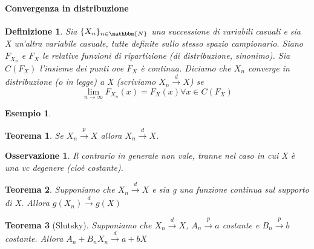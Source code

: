 \documentclass[11pt]{article}
\newtheorem{oss}{Osservazione}
\newtheorem{definizione}{Definizione}
\newtheorem{esempio}{Esempio}
\newtheorem{teo}{Teorema}
\begin{document}
\paragraph{Convergenza in distribuzione}
\begin{definizione}

Sia $\{X_n\}_{n\in\mathbbm{N}}$ una successione di variabili casuali e 
sia X un'altra variabile casuale, tutte definite sullo stesso spazio campionario.
Siano $F_{X_n}$ e $F_X$ le relative funzioni di ripartizione (di distribuzione, sinonimo).
Sia $C(F_X)$ l'insieme dei punti ove $F_X$ è continua. 
Diciamo che $X_n$ converge in distribuzione (o in legge) a X (scriviamo $X_n\stackrel{d}{\rightarrow}X$) se 
$$\lim_{n \rightarrow\infty} F_{X_n}(x)=F_X(x) \forall x \in C(F_X)$$
\end{definizione}
\begin{esempio}
\end{esempio}
\begin{teo}
Se $X_n\stackrel{p}{\rightarrow}X$ allora $X_n\stackrel{d}{\rightarrow}X$.
\end{teo}
\begin{oss}
Il contrario in generale non vale, tranne nel caso in cui X è una vc degenere (cioè costante).
\end{oss}
\begin{teo} Supponiamo che $X_n\stackrel{d}{\rightarrow}X$ e sia g una funzione continua sul supporto di X. Allora $g(X_n)\stackrel{d}{\rightarrow}g(X)$
\end{teo}
\begin{teo} [Slutsky] Supponiamo che $X_n\stackrel{d}{\rightarrow}X$, $A_n\stackrel{p}{\rightarrow}a$ costante e $B_n\stackrel{p}{\rightarrow}b$ costante. Allora $A_n+B_n X_n\stackrel{d}{\rightarrow}a+bX$
\end{teo}
\end{document}
